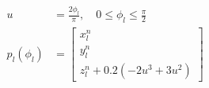 \documentclass[border=7pt]{standalone}
\begin{document}
\color{ink}
$\displaystyle \begin{aligned}u&=\frac{2\phi_l}{\pi},\quad 0\leq\phi_l\leq\frac{\pi}{2}\\p_l(\phi_l)&=\begin{bmatrix}x_l^n\\y_l^n\\z_l^n+0.2(-2u^3+3u^2)\end{bmatrix}\end{aligned}$
\end{document}
